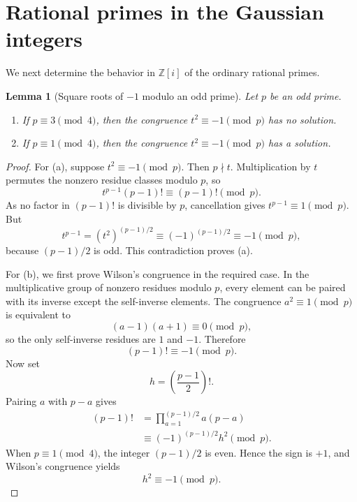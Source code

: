 \documentclass[11pt,a4paper]{article}
\numberwithin{equation}{section}
\newtheorem{lemma}[theorem]{Lemma}
\theoremstyle{definition}
\theoremstyle{remark}
\newcommand{\Z}{\mathbb Z}
\newcommand{\Zi}{\Z[i]}
\newcommand{\ndivides}{\mathrel{\nmid}}
\begin{document}
\section{Rational primes in the Gaussian integers}
\label{sec:gaussian-primes}

We next determine the behavior in $\Zi$ of the ordinary rational primes.

\begin{lemma}[Square roots of $-1$ modulo an odd prime]
\label{lem:sqrt-minus-one}
Let $p$ be an odd prime.
\begin{enumerate}[label=\textup{(\alph*)}]
 \item If $p\equiv3\pmod4$, then the congruence $t^2\equiv-1\pmod p$ has no solution.
 \item If $p\equiv1\pmod4$, then the congruence $t^2\equiv-1\pmod p$ has a solution.
\end{enumerate}
\end{lemma}

\begin{proof}
For (a), suppose $t^2\equiv-1\pmod p$. Then $p\ndivides t$. Multiplication by $t$ permutes the nonzero residue classes modulo $p$, so
\[
 t^{p-1}(p-1)!\equiv(p-1)!\pmod p.
\]
As no factor in $(p-1)!$ is divisible by $p$, cancellation gives $t^{p-1}\equiv1\pmod p$. But
\[
 t^{p-1}=(t^2)^{(p-1)/2}\equiv(-1)^{(p-1)/2}\equiv-1\pmod p,
\]
because $(p-1)/2$ is odd. This contradiction proves (a).

For (b), we first prove Wilson's congruence in the required case. In the multiplicative group of nonzero residues modulo $p$, every element can be paired with its inverse except the self-inverse elements. The congruence $a^2\equiv1\pmod p$ is equivalent to
\[
 (a-1)(a+1)\equiv0\pmod p,
\]
so the only self-inverse residues are $1$ and $-1$. Therefore
\[
 (p-1)!\equiv-1\pmod p.
\]
Now set
\[
 h=\left(\frac{p-1}{2}\right)!.
\]
Pairing $a$ with $p-a$ gives
\begin{align*}
 (p-1)!
 &=\prod_{a=1}^{(p-1)/2}a(p-a)\\
 &\equiv(-1)^{(p-1)/2}h^2\pmod p.
\end{align*}
When $p\equiv1\pmod4$, the integer $(p-1)/2$ is even. Hence the sign is $+1$, and Wilson's congruence yields
\[
 h^2\equiv-1\pmod p.
\]
\end{proof}
\end{document}
